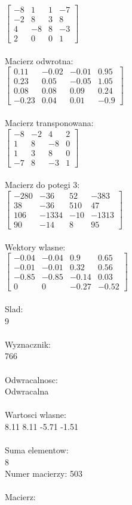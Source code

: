 \documentclass[a4paper,12pt]{article}
\begin{document}
$\begin{bmatrix} -8&1&1&-7\\-2&8&3&8\\4&-8&8&-3\\2&0&0&1 \end{bmatrix}$
\\
\\
Macierz odwrotna:\\

$\begin{bmatrix} 0.11&-0.02&-0.01&0.95\\0.23&0.05&-0.05&1.05\\0.08&0.08&0.09&0.24\\-0.23&0.04&0.01&-0.9 \end{bmatrix}$
\\
\\
Macierz transponowana:\\

$\begin{bmatrix} -8&-2&4&2\\1&8&-8&0\\1&3&8&0\\-7&8&-3&1 \end{bmatrix}$
\\
\\
Macierz do potegi 3:\\

$\begin{bmatrix} -280&-36&52&-383\\38&-36&510&47\\106&-1334&-10&-1313\\90&-14&8&95 \end{bmatrix}$
\\
\\
Wektory wlasne:\\

$\begin{bmatrix} -0.04&-0.04&0.9&0.65\\-0.01&-0.01&0.32&0.56\\-0.85&-0.85&-0.14&0.03\\0&0&-0.27&-0.52 \end{bmatrix}$
\\
\\
Slad:\\
9
\\
\\
Wyznacznik:\\
766
\\
\\
Odwracalnosc:\\
Odwracalna
\\
\\
Wartosci wlasne:\\
8.11 8.11 -5.71 -1.51
\\
\\
Suma elementow:\\
8
\\
\newpage
Numer macierzy:
503
\\
\\
Macierz:\\
\end{document}
